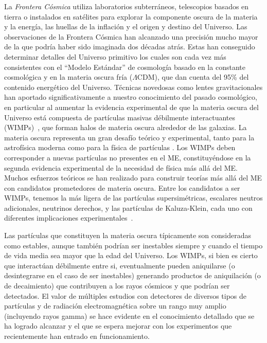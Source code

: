 La \emph{Frontera Cósmica} utiliza laboratorios subterráneos,
telescopios basados en tierra o instalados en satélites
para explorar la componente oscura de la materia y la energía, las huellas
de la inflación y el origen y destino del Universo. Las observaciones
de la Frontera Cósmica han alcanzado una precisión mucho mayor de la
que podría haber sido imaginada dos décadas atrás. Estas han conseguido
determinar detalles del Universo primitivo los cuales son cada vez más
consistentes con el ``Modelo Estándar'' de cosmología basado en la
constante cosmológica y en la materia oscura fría ($\Lambda$CDM), que
dan cuenta del 95\% del contenido energético del Universo. Técnicas
novedosas como lentes gravitacionales han aportado significativamente
a nuestro conocimiento del pasado cosmológico, en particular al
aumentar la evidencia experimental de que la materia oscura del
Universo está compuesta de partículas masivas débilmente
interactuantes (WIMPs)~\cite{Jungman:1995df,Bertone:2004pz}, que forman
halos de materia oscura alrededor de las galaxias.
La materia oscura representa un gran desafío teórico y experimental,
tanto para la astrofísica moderna como para la física de partículas
\cite{Jungman:1995df,Bertone:2004pz, Amsler:2008zzb, Bertone:2010}.
Los WIMPs deben corresponder a nuevas partículas no presentes en el
ME, constituyéndose en la segunda evidencia experimental de la necesidad
de física más allá del ME.  Muchos esfuerzos teóricos se han realizado
para construir teorías más allá del ME con candidatos
prometedores de materia oscura. Entre los candidatos a ser WIMPs,
tenemos la más ligera de las partículas supersimétricas, escalares
neutros adicionales, neutrinos derechos, y las partículas de
Kaluza-Klein, cada uno con diferentes implicaciones experimentales~\cite{Bertone:2010}.


Las partículas que constituyen la materia oscura típicamente son
consideradas como estables, aunque también podrían ser inestables
siempre y cuando el tiempo de vida media sea mayor que la edad del
Universo. Los WIMPs, si bien es cierto que interactúan débilmente
entre si, eventualmente pueden aniquilarse (o desintegrarse en el caso
de ser inestables) generando productos de aniquilación (o de
decaimiento) que contribuyen a los rayos cósmicos y que podrían ser
detectados.  El valor de múltiples estudios con detectores de diversos
tipos de partículas y de radiación electromagnética sobre un rango muy
amplio (incluyendo rayos gamma) se hace evidente en el conocimiento
detallado que se ha logrado alcanzar y el que se espera mejorar con
los experimentos que recientemente han entrado en funcionamiento.


